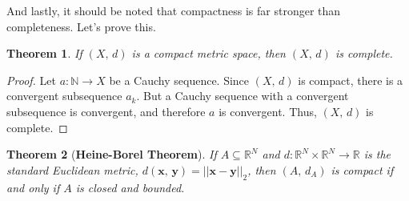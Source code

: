 \documentclass{article}
\theoremstyle{plain}
\newtheorem{theorem}{Theorem}[section]
\theoremstyle{normal}
\begin{document}
        And lastly, it should be noted that compactness is far stronger than
        completeness. Let's prove this.
        \begin{theorem}
            If $(X,\,d)$ is a compact metric space, then $(X,\,d)$ is complete.
        \end{theorem}
        \begin{proof}
            Let $a:\mathbb{N}\rightarrow{X}$ be a Cauchy sequence. Since
            $(X,\,d)$ is compact, there is a convergent subsequence
            $a_{k}$. But a Cauchy sequence with a convergent subsequence is
            convergent, and therefore $a$ is convergent. Thus, $(X,\,d)$ is
            complete.
        \end{proof}
        \begin{theorem}[\textbf{Heine-Borel Theorem}]
            If $A\subseteq\mathbb{R}^{N}$ and
            $d:\mathbb{R}^{N}\times\mathbb{R}^{N}\rightarrow\mathbb{R}$ is the
            standard Euclidean metric,
            $d(\mathbf{x},\,\mathbf{y})=||\mathbf{x}-\mathbf{y}||_{2}$, then
            $(A,\,d_{A})$ is compact if and only if $A$ is closed and bounded.
        \end{theorem}
\end{document}
